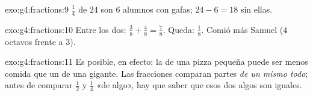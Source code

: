 \begin{solution}{exo:g4:fractions:9}
$\frac14$ de $24$ son $6$ alumnos con gafas; $24 - 6 = 18$
sin ellas.
\end{solution}

\begin{solution}{exo:g4:fractions:10}
Entre los dos: $\frac38 + \frac48 = \frac78$. Queda: $\frac18$. Comió más
Samuel ($4$ octavos frente a $3$).
\end{solution}

\begin{solution}{exo:g4:fractions:11}
Es posible, en efecto: la  de una pizza pequeña puede ser menos comida que un
 de una gigante. Las fracciones comparan partes \emph{de un mismo
todo}; antes de comparar $\frac12$ y $\frac14$ «de algo»,
hay que saber que esos dos algos son iguales.
\end{solution}
